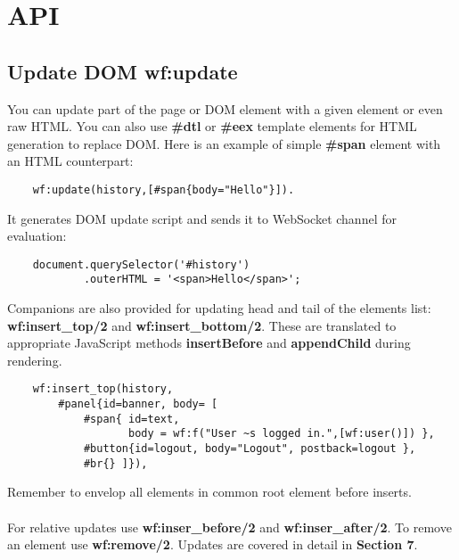 \section{API}

\subsection{Update DOM \bf{wf:update}}
You can update part of the page or DOM element with a given
element or even raw HTML. You can also use {\bf \#dtl}
or {\bf \#eex} template elements for HTML generation to
replace DOM. Here is an example of simple {\bf \#span} element
with an HTML counterpart:

\vspace{1\baselineskip}
\begin{lstlisting}
    wf:update(history,[#span{body="Hello"}]).
\end{lstlisting}
\vspace{1\baselineskip}

It generates DOM update script and sends it to
WebSocket channel for evaluation:

\vspace{1\baselineskip}
\begin{lstlisting}
    document.querySelector('#history')
            .outerHTML = '<span>Hello</span>';
\end{lstlisting}
\vspace{1\baselineskip}

Companions are also provided for updating head and tail
of the elements list: {\bf wf:insert\_top/2} and
{\bf wf:insert\_bottom/2}. These are translated to appropriate
JavaScript methods {\bf insertBefore} and {\bf appendChild} during rendering.

\vspace{1\baselineskip}
\begin{lstlisting}
    wf:insert_top(history,
        #panel{id=banner, body= [
            #span{ id=text,
                   body = wf:f("User ~s logged in.",[wf:user()]) },
            #button{id=logout, body="Logout", postback=logout },
            #br{} ]}),
\end{lstlisting}
\vspace{1\baselineskip}

Remember to envelop all elements in common root element before inserts.

\paragraph{}
For relative updates use {\bf wf:inser\_before/2} and {\bf wf:inser\_after/2}.
To remove an element use {\bf wf:remove/2}.
Updates are covered in detail in {\bf Section 7}.

